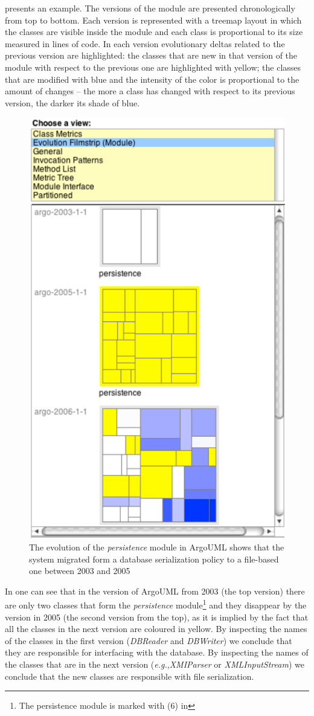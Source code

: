 \documentclass[preprint,12pt]{elsarticle}
\newcommand{\cd}[1]{{\em{#1}}}
\newcommand{\eg}{\emph{e.g.},\xspace}
\begin{document}
 presents an example. The versions of the module are presented chronologically from top to bottom. Each version is represented with a treemap layout in which the classes are visible inside the module and each class is proportional to its size measured in lines of code. In each version evolutionary deltas related to the previous version are highlighted: the classes that are new in that version of the module with respect to the previous one are highlighted with yellow; the classes that are modified with blue and the intensity of the color is proportional to the amount of changes -- the more a class has changed with respect to its previous version, the darker its shade of blue. 

\begin{figure}[h]
\begin{center}
\includegraphics[width=0.45\linewidth]{images/ModuleFilmstrip}
\caption{The evolution of the \cd{persistence} module in ArgoUML shows that the system migrated form a database serialization policy to a file-based one between 2003 and 2005}
\end{center}
\end{figure}

In  one can see that in the version of ArgoUML from 2003 (the top version) there are only two classes that form the \cd{persistence} module\footnote{The persistence module is marked with (6) in } and they disappear by the version in 2005 (the second version from the top), as it is implied by the fact that all the classes in the next version are coloured in yellow. By inspecting the names of the classes in the first version (\cd{DBReader} and \cd{DBWriter}) we conclude that they are responsible for interfacing with the database. By inspecting the names of the classes that are in the next version (\eg \cd{XMIParser} or \cd{XMLInputStream}) we conclude that the new classes are responsible with file serialization. 
\end{document}
